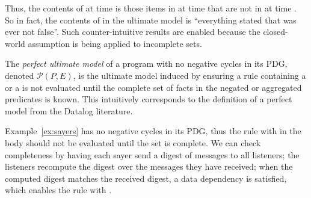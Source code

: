 Thus, the contents of  at time  is those items in  at time  that are not in  at time .  So in fact, the contents of  in the ultimate model is ``everything stated that was ever not false''.  Such counter-intuitive results are enabled because the closed-world assumption is being applied to incomplete sets.

\begin{definition}
The {\em perfect ultimate model} of a \lang program with no negative cycles in its PDG, denoted $\mathcal{P}(P, E)$, is the ultimate model induced by ensuring a rule containing a \dedalus{!} or a  is not evaluated until the complete set of facts in the negated or aggregated predicates is known.
This intuitively corresponds to the definition of a perfect model from the Datalog literature.
\end{definition}


Example~\ref{ex:sayers} has no negative cycles in its PDG, thus the rule with  in the body should not be evaluated until the  set is complete.  We can check completeness by having each sayer send a digest of  messages to all listeners; the listeners recompute the digest over the  messages they have received; when the computed digest matches the received digest, a data dependency is satisfied, which enables the rule with .


